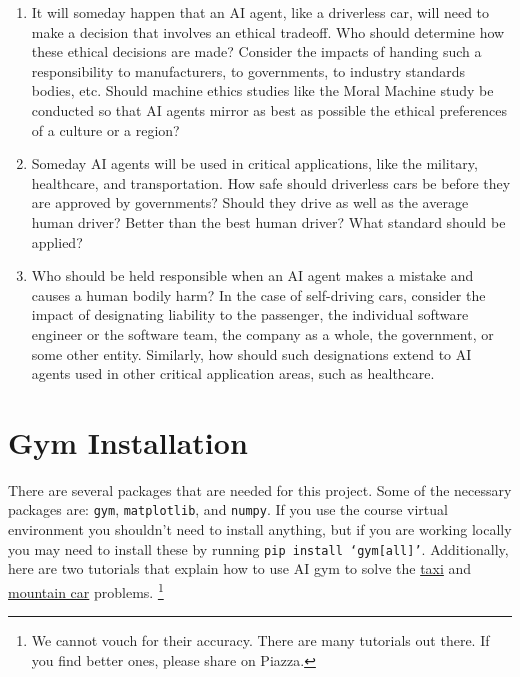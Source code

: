\documentclass{article}
\begin{document}
\begin{enumerate}
\item 
It will someday happen that an AI agent, like a driverless car, will
need to make a decision that involves an ethical tradeoff.  Who should
determine how these ethical decisions are made?  Consider the impacts
of handing such a responsibility to manufacturers, to governments, to
industry standards bodies, etc.  Should machine ethics studies like
the Moral Machine study be conducted so that AI agents mirror as best
as possible the ethical preferences of a culture or a region?

\item 
Someday AI agents will be used in critical applications, like the
military, healthcare, and transportation.  How safe should driverless
cars be before they are approved by governments?  Should they drive
as well as the average human driver?  Better than the best human
driver?  What standard should be applied?

\item 
Who should be held responsible when an AI agent makes a mistake and
causes a human bodily harm?  In the case of self-driving cars,
consider the impact of designating liability to the passenger, the
individual software engineer or the software team, the company as a
whole, the government, or some other entity.  Similarly, how should
such designations extend to AI agents used in other critical
application areas, such as healthcare.
\end{enumerate}


\section{Gym Installation}
\label{gym}

There are several packages that are needed for this project.  Some of
the necessary packages are: \texttt{gym}, \texttt{matplotlib}, and
\texttt{numpy}.  If you use the course virtual environment you
shouldn't need to install anything, but if you are working locally you
may need to install these by running \texttt{pip install `gym[all]'}.
%
Additionally, here are two tutorials that explain how to use AI gym to
solve the
\href{https://towardsdatascience.com/reinforcement-learning-lets-teach-a-taxi-cab-how-to-drive-4fd1a0d00529}{taxi}
and  
\href{https://towardsdatascience.com/getting-started-with-reinforcement-learning-and-open-ai-gym-c289aca874f}{mountain car}
problems.%
\footnote{We cannot vouch for their accuracy.  There are many tutorials out there.
  If you find better ones, please share on Piazza.}
\end{document}
